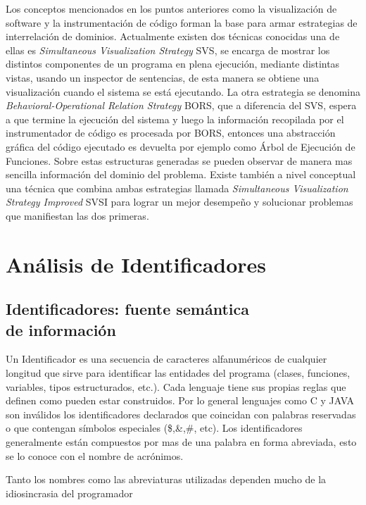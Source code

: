 \documentclass[12pt]{report}
\begin{document}
Los conceptos mencionados en los puntos anteriores como la visualización de software y la instrumentación de código forman la base para armar estrategias de interrelación de dominios.
Actualmente existen dos técnicas conocidas una de ellas es \textit{Simultaneous Visualization Strategy} SVS, se encarga de mostrar los distintos componentes de un programa en plena ejecución, mediante distintas vistas, usando un inspector de sentencias, de esta manera se obtiene una visualización cuando el sistema se está ejecutando.
La otra estrategia se denomina \textit{Behavioral-Operational Relation Strategy} BORS, que a diferencia del SVS, espera a que termine la ejecución del sistema y luego la información recopilada por el instrumentador de código es procesada por BORS, entonces una abstracción gráfica del código ejecutado es devuelta por ejemplo como Árbol de Ejecución de Funciones. Sobre estas estructuras generadas se pueden observar de manera mas sencilla información del dominio del problema.
Existe también a nivel conceptual una técnica que combina ambas estrategias llamada \textit{Simultaneous Visualization Strategy Improved} SVSI para lograr un mejor desempeño y solucionar problemas que manifiestan las dos primeras.\cite{BRM10,MPMR07}
 




\chapter{Análisis de Identificadores}
\section{Identificadores: fuente semántica \\de información}

Un Identificador es una secuencia de caracteres alfanuméricos de cualquier longitud que sirve para identificar las entidades del programa (clases, funciones, variables, tipos estructurados, etc.). 
Cada lenguaje tiene sus propias reglas que definen como pueden estar construidos. Por lo general lenguajes como C y JAVA son inválidos los identificadores declarados que coincidan con palabras reservadas o que contengan símbolos especiales (\$,\&,\#, etc).
Los identificadores generalmente están compuestos por mas de una palabra en forma abreviada, esto se lo conoce con el nombre de acrónimos.


Tanto los nombres como las abreviaturas utilizadas dependen mucho de la idiosincrasia del programador


\end{document}
